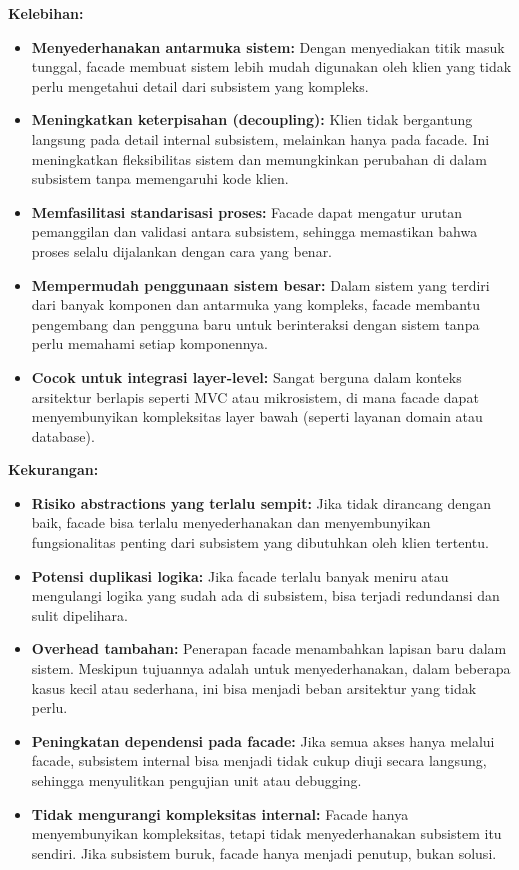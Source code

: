 \textbf{Kelebihan:}
\begin{itemize}
	\item \textbf{Menyederhanakan antarmuka sistem:} Dengan menyediakan titik masuk tunggal, facade membuat sistem lebih mudah digunakan oleh klien yang tidak perlu mengetahui detail dari subsistem yang kompleks.
	
	\item \textbf{Meningkatkan keterpisahan (decoupling):} Klien tidak bergantung langsung pada detail internal subsistem, melainkan hanya pada facade. Ini meningkatkan fleksibilitas sistem dan memungkinkan perubahan di dalam subsistem tanpa memengaruhi kode klien.
	
	\item \textbf{Memfasilitasi standarisasi proses:} Facade dapat mengatur urutan pemanggilan dan validasi antara subsistem, sehingga memastikan bahwa proses selalu dijalankan dengan cara yang benar.
	
	\item \textbf{Mempermudah penggunaan sistem besar:} Dalam sistem yang terdiri dari banyak komponen dan antarmuka yang kompleks, facade membantu pengembang dan pengguna baru untuk berinteraksi dengan sistem tanpa perlu memahami setiap komponennya.
	
	\item \textbf{Cocok untuk integrasi layer-level:} Sangat berguna dalam konteks arsitektur berlapis seperti MVC atau mikrosistem, di mana facade dapat menyembunyikan kompleksitas layer bawah (seperti layanan domain atau database).
\end{itemize}

\textbf{Kekurangan:}
\begin{itemize}
	\item \textbf{Risiko abstractions yang terlalu sempit:} Jika tidak dirancang dengan baik, facade bisa terlalu menyederhanakan dan menyembunyikan fungsionalitas penting dari subsistem yang dibutuhkan oleh klien tertentu.
	
	\item \textbf{Potensi duplikasi logika:} Jika facade terlalu banyak meniru atau mengulangi logika yang sudah ada di subsistem, bisa terjadi redundansi dan sulit dipelihara.
	
	\item \textbf{Overhead tambahan:} Penerapan facade menambahkan lapisan baru dalam sistem. Meskipun tujuannya adalah untuk menyederhanakan, dalam beberapa kasus kecil atau sederhana, ini bisa menjadi beban arsitektur yang tidak perlu.
	
	\item \textbf{Peningkatan dependensi pada facade:} Jika semua akses hanya melalui facade, subsistem internal bisa menjadi tidak cukup diuji secara langsung, sehingga menyulitkan pengujian unit atau debugging.
	
	\item \textbf{Tidak mengurangi kompleksitas internal:} Facade hanya menyembunyikan kompleksitas, tetapi tidak menyederhanakan subsistem itu sendiri. Jika subsistem buruk, facade hanya menjadi penutup, bukan solusi.
\end{itemize}

